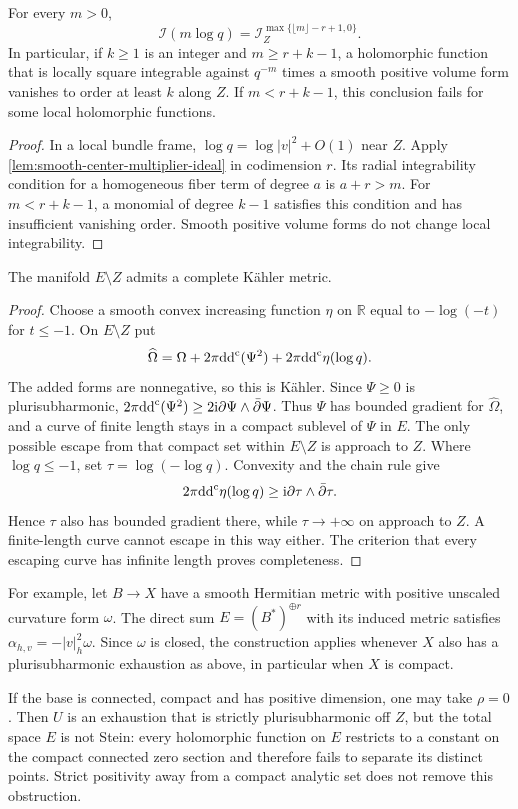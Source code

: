 \begin{corollary}\label{cor:negative-bundle-weight-jets}
For every $m>0$,
\[
 \mathcal I(m\log q)
    =\mathcal I_Z^{\max\{\lfloor m\rfloor-r+1,0\}}.
\]
In particular, if $k\geq1$ is an integer and $m\geq r+k-1$,
a holomorphic function that is locally square integrable against
$q^{-m}$ times a smooth positive volume form vanishes to order
at least $k$ along $Z$. If $m<r+k-1$, this conclusion fails for
some local holomorphic functions.
\end{corollary}
\begin{proof}
In a local bundle frame, $\log q=\log|v|^2+O(1)$ near $Z$.
Apply \cref{lem:smooth-center-multiplier-ideal} in codimension
$r$. Its radial integrability condition for a homogeneous fiber
term of degree $a$ is $a+r>m$. For $m<r+k-1$, a monomial
of degree $k-1$ satisfies this condition and has insufficient
vanishing order. Smooth positive volume forms do not change
local integrability.
\end{proof}

\begin{corollary}\label{cor:negative-bundle-complete-punctured-metric}
The manifold $E\setminus Z$ admits a complete K\"ahler metric.
\end{corollary}
\begin{proof}
Choose a smooth convex increasing function $\eta$ on $\mathbb R$
equal to $-\log(-t)$ for $t\leq-1$. On $E\setminus Z$ put
\[
 \widehat\Omega
   =\Omega+2\pi\mathrm{dd}^{\mathrm{c}}(\Psi^2)
       +2\pi\mathrm{dd}^{\mathrm{c}}\eta(\log q).
\]
The added forms are nonnegative, so this is K\"ahler.
Since $\Psi\geq0$ is plurisubharmonic,
$2\pi\mathrm{dd}^{\mathrm{c}}(\Psi^2)\geq
2\mathrm i\partial\Psi\wedge\bar\partial\Psi$.
Thus $\Psi$ has bounded gradient for $\widehat\Omega$, and a
curve of finite length stays in a compact sublevel of $\Psi$ in
$E$. The only possible escape from that compact set within
$E\setminus Z$ is approach to $Z$.
Where $\log q\leq-1$, set $\tau=\log(-\log q)$. Convexity and
the chain rule give
\[
 2\pi\mathrm{dd}^{\mathrm{c}}\eta(\log q)
   \geq\mathrm i\partial\tau\wedge\bar\partial\tau.
\]
Hence $\tau$ also has bounded gradient there, while
$\tau\to+\infty$ on approach to $Z$. A finite-length curve
cannot escape in this way either. The criterion that every
escaping curve has infinite length proves completeness.
\end{proof}

For example, let $B\to X$ have a smooth Hermitian metric with
positive unscaled curvature form $\omega$. The direct sum
$E=(B^*)^{\oplus r}$ with its induced metric satisfies
$\alpha_{h,v}=-|v|_h^2\omega$.
Since $\omega$ is closed, the construction applies whenever $X$
also has a plurisubharmonic exhaustion as above, in particular
when $X$ is compact.

If the base is connected, compact and has positive dimension,
one may take $\rho=0$. Then $U$ is an exhaustion that is
strictly plurisubharmonic off $Z$, but the total space $E$ is
not Stein: every holomorphic function on $E$ restricts to a
constant on the compact connected zero section and therefore
fails to separate its distinct points. Strict positivity away
from a compact analytic set does not remove this obstruction.
